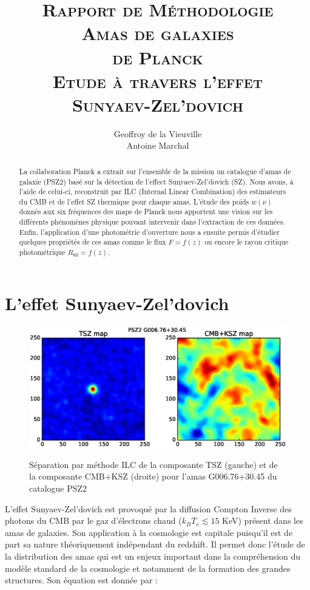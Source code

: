 \documentclass[a4paper,11pt]{article}
\title{{\textsc{\Large{Rapport de Méthodologie}\\ [3cm]
      \textbf{\LARGE{Amas de galaxies \\ de Planck}} \\ [0.6cm] 
Etude à travers l'effet \\ Sunyaev-Zel’dovich}} \\[2cm]}
\author{Geoffroy de la Vieuville \\ Antoine Marchal}
\date{}
\begin{document}
\begin{titlingpage}
\maketitle
\begin{abstract}
  La collaboration Planck a extrait sur l'ensemble de la mission un
  catalogue d'amas de galaxie (PSZ2) basé sur la détection de l'effect
  Sunyaev-Zel’dovich (SZ). Nous avons, à l'aide de celui-ci,
  reconstruit par ILC (Internal Linear Combination) des estimateurs du
  CMB et de l'effet SZ thermique pour chaque amas. 
  L'étude des poids $w(\nu)$ donnés aux six fréquences des 
  maps de Planck nous apportent une vision sur les différents
  phénomènes physique pouvant intervenir dans l'extraction de ces données. Enfin,
  l'application d'une photométrie d'ouverture nous a ensuite permis 
  d'étudier quelques propriétés de ces amas comme le flux $F=f(z)$ 
  ou encore le rayon critique photométrique $R_{60}=f(z)$.
\end{abstract}
\end{titlingpage}
\newpage
\section{L'effet Sunyaev-Zel’dovich}

\begin{figure}[b!]
  \centering
  \includegraphics[width=4.5in]{sz_effect.eps}
  \label{sz_effect}
  \caption{Séparation par méthode ILC de la composante TSZ (gauche) et de la
    composante CMB+KSZ (droite) pour l'amas G006.76+30.45 du catalogue
  PSZ2}
\end{figure}

L'effet Sunyaev-Zel’dovich \cite{Sunyaev} est provoqué par la diffusion Compton
Inverse des photons du CMB par le gaz d'électrons chaud ($k_B T_e
\lesssim 15$ KeV) présent dans les amas de galaxies. Son application à
la cosmologie est capitale puisqu'il est de part sa nature
théoriquement indépendant du redshift. Il permet donc l'étude de la
distribution des amas qui est un enjeux important dans la
compréhension du modèle standard de la cosmologie et notamment de la
formation des grandes structures. Son équation est donnée par : 
\end{document}
